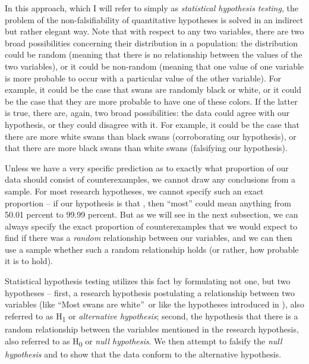 In this approach, which I will refer to simply as \textit{statistical hypothesis testing}, the problem of the non\hyp{}falsifiability  of quantitative  hypotheses is solved in an indirect but rather elegant way. Note that with respect to any two variables, there are two broad possibilities concerning their distribution  in a population: the distribution could be random  (meaning that there is no relationship between the values of the two variables), or it could be non\hyp{}random  (meaning that one value of one variable is more probable to occur with a particular value of the other variable). For example, it could be the case that swans are randomly  black or white, or it could be the case that they are more probable to have one of these colors. If the latter is true, there are, again, two broad possibilities: the data could agree with our hypothesis, or they could disagree with it. For example, it could be the case that there are more white swans than black swans (corroborating  our hypothesis), or that there are more black swans than white swans (falsifying  our hypothesis).

Unless we have a very specific prediction as to exactly what proportion of our data should consist of counterexamples,  we cannot draw any conclusions from a sample.  For most research hypotheses, we cannot specify such an exact proportion -- if our hypothesis is that , then ``most'' could mean anything from 50.01 percent to 99.99 percent. But as we will see in the next subsection, we can always specify the exact proportion of counterexamples that we would expect to find if there was a \textit{random}  relationship between our variables, and we can then use a sample whether such a random  relationship holds (or rather, how probable it is to hold).

Statistical hypothesis testing utilizes this fact by formulating not one, but two hypotheses -- first, a research hypothesis postulating a relationship between two variables (like ``Most swans are white'' or like the hypotheses introduced in ), also referred to as H\textsubscript{1} or \textit{alternative hypothesis}; second, the hypothesis that there is a random  relationship between the variables mentioned in the research hypothesis, also referred to as H\textsubscript{0} or \textit{null hypothesis}.  We then attempt to falsify  the \textit{null hypothesis} and to show that the data conform to the alternative hypothesis.

